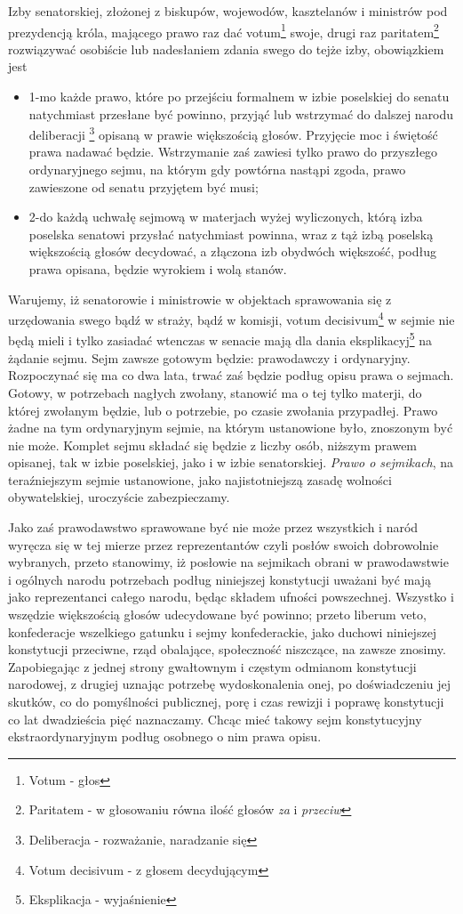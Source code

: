 \documentclass{book}
\begin{document}
 Izby senatorskiej, złożonej z biskupów, wojewodów, kasztelanów i ministrów pod prezydencją króla, mającego prawo raz dać votum\footnote{Votum - głos} swoje, drugi raz paritatem\footnote{Paritatem - w głosowaniu równa ilość głosów \textit{za} i \textit{przeciw}} rozwiązywać osobiście lub nadesłaniem zdania swego do tejże izby, obowiązkiem jest 
\begin{itemize}
\item 1-mo każde prawo, które po przejściu formalnem w izbie poselskiej do senatu natychmiast przesłane być powinno, przyjąć lub wstrzymać do dalszej narodu deliberacji \footnote{Deliberacja - rozważanie, naradzanie się} opisaną w prawie większością głosów. Przyjęcie moc i świętość prawa nadawać będzie. Wstrzymanie zaś zawiesi tylko prawo do przyszłego ordynaryjnego sejmu, na którym gdy powtórna nastąpi zgoda, prawo zawieszone od senatu przyjętem być musi; 
\item 2-do każdą uchwałę sejmową w materjach wyżej wyliczonych, którą izba poselska senatowi przysłać natychmiast powinna,  wraz z tąż izbą poselską większością głosów decydować, a złączona izb obydwóch większość, podług prawa opisana, będzie wyrokiem i wolą stanów.  
\end{itemize}
Warujemy, iż senatorowie i ministrowie w objektach sprawowania się z urzędowania swego bądź w straży, bądź w komisji, votum decisivum\footnote{Votum decisivum - z głosem decydującym} w sejmie nie będą mieli i tylko zasiadać wtenczas w senacie mają dla dania eksplikacyj\footnote{Eksplikacja - wyjaśnienie} na żądanie sejmu. Sejm zawsze gotowym będzie: prawodawczy i ordynaryjny. Rozpoczynać się ma co dwa lata, trwać zaś będzie podług opisu prawa o sejmach.  Gotowy, w potrzebach nagłych zwołany, stanowić ma o tej tylko materji, do której zwołanym będzie, lub o potrzebie, po czasie zwołania przypadłej.  Prawo żadne na tym ordynaryjnym sejmie, na którym ustanowione było, znoszonym być nie może. Komplet sejmu składać się będzie z liczby osób, niższym prawem opisanej, tak w izbie poselskiej, jako i w izbie senatorskiej. \textit{Prawo o sejmikach}, na teraźniejszym sejmie ustanowione, jako najistotniejszą zasadę wolności obywatelskiej, uroczyście zabezpieczamy. 

 Jako zaś prawodawstwo sprawowane być nie może przez wszystkich i naród wyręcza się w tej mierze przez reprezentantów czyli posłów swoich dobrowolnie wybranych, przeto stanowimy, iż posłowie na sejmikach obrani w prawodawstwie i ogólnych narodu potrzebach podług niniejszej konstytucji uważani być mają jako reprezentanci całego narodu, będąc składem ufności powszechnej. Wszystko i wszędzie większością głosów udecydowane być powinno; przeto liberum veto, konfederacje wszelkiego gatunku i sejmy konfederackie, jako duchowi niniejszej konstytucji przeciwne, rząd obalające, społeczność niszczące, na zawsze znosimy. Zapobiegając z jednej strony gwałtownym i częstym odmianom konstytucji narodowej, z drugiej uznając potrzebę wydoskonalenia onej, po doświadczeniu jej skutków,   co do pomyślności publicznej, porę i czas rewizji i poprawę konstytucji co lat dwadzieścia pięć naznaczamy.  Chcąc mieć takowy sejm konstytucyjny ekstraordynaryjnym podług osobnego o nim prawa opisu. 
\end{document}
